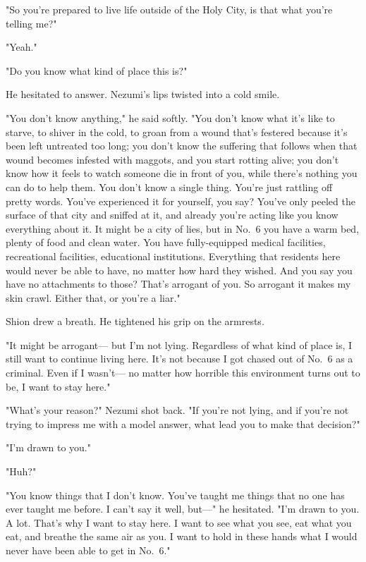 "So you're prepared to live life outside of the Holy City, is that what
you're telling me?"

"Yeah."

"Do you know what kind of place this is?"

He hesitated to answer. Nezumi's lips twisted into a cold smile.

"You don't know anything," he said softly. "You don't know what it's
like to starve, to shiver in the cold, to groan from a wound that's
festered because it's been left untreated too long; you don't know the
suffering that follows when that wound becomes infested with maggots,
and you start rotting alive; you don't know how it feels to watch
someone die in front of you, while there's nothing you can do to help
them. You don't know a single thing. You're just rattling off pretty
words. You've experienced it for yourself, you say? You've only peeled
the surface of that city and sniffed at it, and already you're acting
like you know everything about it. It might be a city of lies, but in
No.~6 you have a warm bed, plenty of food and clean water. You have
fully-equipped medical facilities, recreational facilities, educational
institutions. Everything that residents here would never be able to
have, no matter how hard they wished. And you say you have no
attachments to those? That's arrogant of you. So arrogant it makes my
skin crawl. Either that, or you're a liar."

Shion drew a breath. He tightened his grip on the armrests.

"It might be arrogant--- but I'm not lying. Regardless of what kind of
place is, I still want to continue living here. It's not because I got
chased out of No.~6 as a criminal. Even if I wasn't--- no matter how
horrible this environment turns out to be, I want to stay here."

"What's your reason?" Nezumi shot back. "If you're not lying, and if
you're not trying to impress me with a model answer, what lead you to
make that decision?"

"I'm drawn to you."

"Huh?"

"You know things that I don't know. You've taught me things that no one
has ever taught me before. I can't say it well, but---" he hesitated. "I'm
drawn to you. A lot. That's why I want to stay here. I want to see what
you see, eat what you eat, and breathe the same air as you. I want to
hold in these hands what I would never have been able to get in No.~6."

